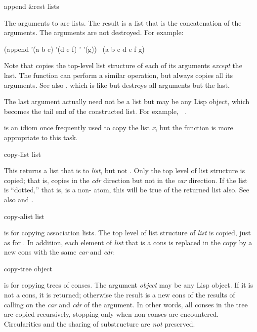\begin{defun}[Function]
append &rest lists

The arguments to  are lists.  The result is a list that is the
concatenation of the arguments.
The arguments are not destroyed.
For example:
\begin{lisp}
(append '(a b c) '(d e f) '{\emptylist} '(g)) \EV\ (a b c d e f g)
\end{lisp}
Note that  copies the top-level list structure of each of its
arguments \emph{except} the last.
The function  can perform a similar operation, but always
copies all its arguments.  See also , which is like 
but destroys all arguments but the last.

The last argument actually need not be a list but may be any Lisp object,
which becomes the tail end of the constructed list.
For example,  \EV\ .

 is an idiom once frequently used to copy the
list \emph{x}, but the  function is more appropriate to this
task.
\end{defun}

\begin{defun}[Function]
copy-list list

This returns a list that is  to \emph{list}, but not .
Only the top level of list structure is copied; that is, 
copies in the \emph{cdr} direction but not in the \emph{car} direction.
If the list is ``dotted,'' that is, 
is a non-{\nil} atom, this will be true of the returned list also.
See also  and .
\end{defun}

\begin{defun}[Function]
copy-alist list

 is for copying association lists.  The top level of
list structure of \emph{list} is copied, just as for .
In addition, each element of \emph{list} that is a cons is replaced
in the copy by a new cons with the same \emph{car} and \emph{cdr}.
\end{defun}

\begin{defun}[Function]
copy-tree object

 is for copying trees of conses.
The argument \emph{object} may be any Lisp object.
If it is not a cons, it is returned; otherwise
the result is a new cons of the results of calling 
on the \emph{car} and \emph{cdr} of the argument.  In other words,
all conses in the tree are copied recursively, stopping
only when non-conses are encountered.
Circularities and the sharing of substructure are \emph{not} preserved.
\end{defun}

